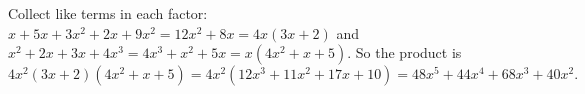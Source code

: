 Collect like terms in each factor: $x+5x+3x^2+2x+9x^2=12x^2+8x=4x(3x+2)$ and $x^2+2x+3x+4x^3=4x^3+x^2+5x=x\left(4x^2+x+5\right)$. So the product is
\[4x^2(3x+2)\left(4x^2+x+5\right)=4x^2\left(12x^3+11x^2+17x+10\right)=\boxed{48x^5+44x^4+68x^3+40x^2}.\]
